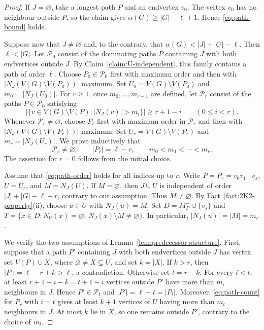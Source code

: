 \documentclass[11pt]{article}
\numberwithin{equation}{section}
\theoremstyle{plain}
\theoremstyle{definition}
\theoremstyle{plain}
\begin{document}
\begin{proof}
If $J=\varnothing$, take a longest path $P$ and an endvertex $v_0$.
The vertex $v_0$ has no neighbour outside $P$, so the claim gives
$\alpha(G)\geq |G|-\ell+1$. Hence \eqref{eq:path-bound} holds.

Suppose now that $J\neq\varnothing$ and, to the contrary, that
$\alpha(G)<|J|+|G|-\ell$. Then $\ell<|G|$.
Let $\mathcal P_0$ consist of the dominating paths $P$ containing $J$
with both endvertices outside $J$.
By Claim~\ref{claim:U-independent}, this family
contains a path of order $\ell$.
Choose $P_0\in\mathcal P_0$ first with maximum order and then
with $|N_J(V(G)\setminus V(P_0))|$ maximum.   Set
$U_0=V(G)\setminus V(P_0)$ and $m_0=|N_J(U_0)|$.
For $r\geq1$, once $m_0,\ldots,m_{r-1}$ are defined, let
$\mathcal P_r$ consist of the paths $P\in\mathcal P_0$ satisfying
\begin{equation}\label{eq:path-count}
    \bigl|\{v\in V(G)\setminus V(P):|N_J(v)|>m_i\}\bigr|
    \geq r+1-i \qquad (0\leq i<r).
\end{equation}
Whenever $\mathcal P_r\neq\varnothing$, choose $P_r$ first with
maximum order in $\mathcal P_r$ and then with
$|N_J(V(G)\setminus V(P_r))|$ maximum.   Set
$U_r=V(G)\setminus V(P_r)$ and $m_r=|N_J(U_r)|$.
We prove inductively that
\begin{equation}\label{eq:path-order}
    \mathcal P_r\neq\varnothing,\qquad
    |P_r|=\ell-r,\qquad m_0<m_1<\cdots<m_r.
\end{equation}
The assertion for $r=0$ follows from the initial choice.

Assume that \eqref{eq:path-order} holds for all indices up to $r$.
Write $P=P_r=v_0v_1\cdots v_s$, $U=U_r$, and $M=N_J(U)$.
If $M=\varnothing$, then $J\cup U$ is independent of order
$|J|+|G|-\ell+r$, contrary to our assumption.
Thus $M\neq\varnothing$. By
Fact~\ref{fact:2K2-property}\textup{(ii)}, choose $u\in U$ with
$N_J(u)=M$.   Set $D=M_P^-\cup\{v_s\}$ and
$T=\{x\in D:N_U(x)=\varnothing,\,
N_J(x)\setminus M\neq\varnothing\}$.
In particular, $|N_J(u)|=|M|=m_r$.

We verify the two assumptions of
Lemma~\ref{lem:predecessor-structure}.
First, suppose that a path $P'$ containing $J$ with both
endvertices outside $J$ has vertex set $V(P)\cup X$, where
$\varnothing\neq X\subseteq U$, and   set $k=|X|$.
If $k>r$, then $|P'|=\ell-r+k>\ell$, a contradiction.
Otherwise   set $t=r-k$. For every $i<t$, at least
$r+1-i-k=t+1-i$ vertices outside $P'$ have more than $m_i$
neighbours in $J$. Hence $P'\in\mathcal P_t$ and
$|P'|=\ell-t=|P_t|$.
Moreover, \eqref{eq:path-count} for $P_r$ with $i=t$ gives at
least $k+1$ vertices of $U$ having more than $m_t$ neighbours
in $J$. At most $k$ lie in $X$, so one remains outside $P'$,
contrary to the choice of $m_t$.


\end{proof}
\end{document}
